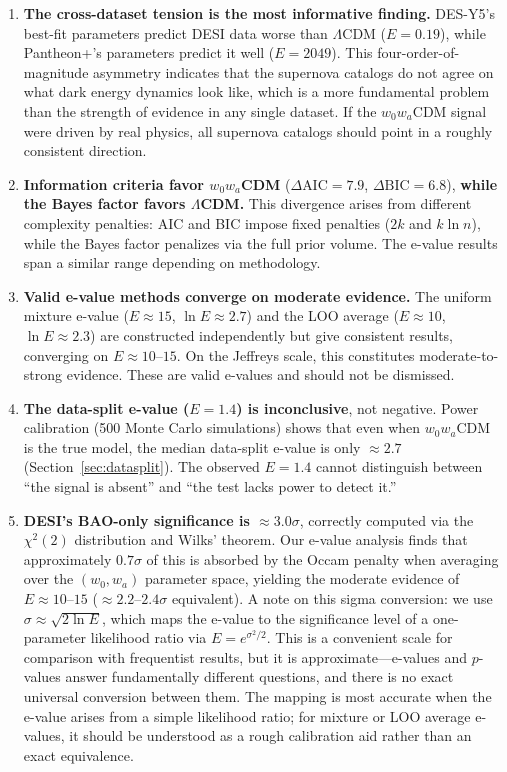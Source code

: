 \documentclass[11pt,a4paper]{article}
\newcommand{\LCDM}{$\Lambda$CDM}
\begin{document}
\begin{enumerate}
    \item \textbf{The cross-dataset tension is the most informative finding.} DES-Y5's best-fit parameters predict DESI data worse than \LCDM{} ($E = 0.19$), while Pantheon+'s parameters predict it well ($E = 2049$). This four-order-of-magnitude asymmetry indicates that the supernova catalogs do not agree on what dark energy dynamics look like, which is a more fundamental problem than the strength of evidence in any single dataset. If the $w_0w_a$CDM signal were driven by real physics, all supernova catalogs should point in a roughly consistent direction.

    \item \textbf{Information criteria favor $w_0w_a$CDM} ($\Delta\text{AIC} = 7.9$, $\Delta\text{BIC} = 6.8$), \textbf{while the Bayes factor favors \LCDM.} This divergence arises from different complexity penalties: AIC and BIC impose fixed penalties ($2k$ and $k\ln n$), while the Bayes factor penalizes via the full prior volume. The e-value results span a similar range depending on methodology.

    \item \textbf{Valid e-value methods converge on moderate evidence.} The uniform mixture e-value ($E \approx 15$, $\ln E \approx 2.7$) and the LOO average ($E \approx 10$, $\ln E \approx 2.3$) are constructed independently but give consistent results, converging on $E \approx 10$--$15$. On the Jeffreys scale, this constitutes moderate-to-strong evidence. These are valid e-values and should not be dismissed.

    \item \textbf{The data-split e-value ($E = 1.4$) is inconclusive}, not negative. Power calibration (500 Monte Carlo simulations) shows that even when $w_0w_a$CDM is the true model, the median data-split e-value is only $\approx 2.7$ (Section~\ref{sec:datasplit}). The observed $E = 1.4$ cannot distinguish between ``the signal is absent'' and ``the test lacks power to detect it.''

    \item \textbf{DESI's BAO-only significance is $\approx 3.0\sigma$}, correctly computed via the $\chi^2(2)$ distribution and Wilks' theorem. Our e-value analysis finds that approximately $0.7\sigma$ of this is absorbed by the Occam penalty when averaging over the $(w_0, w_a)$ parameter space, yielding the moderate evidence of $E \approx 10$--$15$ ($\approx 2.2$--$2.4\sigma$ equivalent). A note on this sigma conversion: we use $\sigma \approx \sqrt{2\ln E}$, which maps the e-value to the significance level of a one-parameter likelihood ratio via $E = e^{\sigma^2/2}$. This is a convenient scale for comparison with frequentist results, but it is approximate---e-values and $p$-values answer fundamentally different questions, and there is no exact universal conversion between them. The mapping is most accurate when the e-value arises from a simple likelihood ratio; for mixture or LOO average e-values, it should be understood as a rough calibration aid rather than an exact equivalence.
\end{enumerate}
\end{document}
